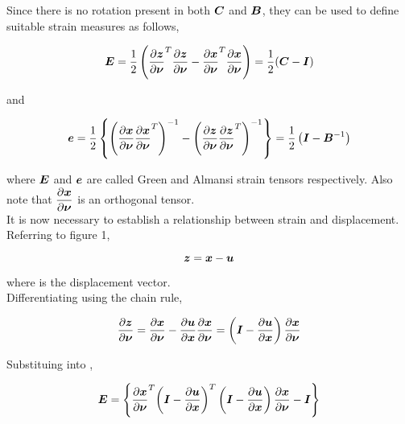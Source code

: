 Since there is no rotation present in both $\matr{C}$ and $\matr{B}$, they can be used to define suitable strain measures as follows,

\begin{equation}
  \matr{E}=\frac{1}{2}\pbrac{\transpose{\delby{\vect{z}}{\vect{\nu}}}\delby{\vect{z}}{\vect{\nu}}-
                       \transpose{\delby{\vect{x}}{\vect{\nu}}}\delby{\vect{x}}{\vect{\nu}}}=
	    \frac{1}{2}(\matr{C}-\matr{I})	       
  \label{eqn:greenstrain}
\end{equation}

\noindent and

\begin{equation}
  \vect{e}=\frac{1}{2}\bbrac{\pbrac{\delby{\vect{x}}{\vect{\nu}}\transpose{\delby{\vect{x}}{\vect{\nu}}}}^{-1}-
                             \pbrac{\delby{\vect{z}}{\vect{\nu}}\transpose{\delby{\vect{z}}{\vect{\nu}}}}^{-1}}=
			     \frac{1}{2}\pbrac{\matr{I}-\matr{B}^{-1}}  
  \label{eqn:almansistrain}
\end{equation}

\noindent where $\matr{E}$ and $\vect{e}$ are called Green and Almansi strain tensors respectively. 
Also note that $\delby{\vect{x}}{\vect{\nu}}$ is an orthogonal tensor. \\

It is now necessary to establish a relationship between strain and displacement. Referring to figure 1, 

\begin{equation}
  \vect{z}=\vect{x}-\vect{u}
  \label{eqn:displacement}
\end{equation}

\noindent where  is the displacement vector. \\

\noindent Differentiating  using the chain rule,

\begin{equation}
  \delby{\vect{z}}{\vect{\nu}}=\delby{\vect{x}}{\vect{\nu}}-\delby{\vect{u}}{\vect{x}}\delby{\vect{x}}{\vect{\nu}}=
                               \pbrac{\matr{I}-\delby{\vect{u}}{\vect{x}}}\delby{\vect{x}}{\vect{\nu}}  
  \label{eqn:displacementgradient}
\end{equation}

\noindent Substituing  into ,

\begin{equation}
  \matr{E}=\bbrac{\transpose{\delby{\vect{x}}{\vect{\nu}}}\transpose{\pbrac{\matr{I}-\delby{\vect{u}}{\vect{x}}}}
                  \pbrac{\matr{I}-\delby{\vect{u}}{\vect{x}}}\delby{\vect{x}}{\vect{\nu}}-\matr{I}}
  \label{eqn:greendisplacement1}
\end{equation}


